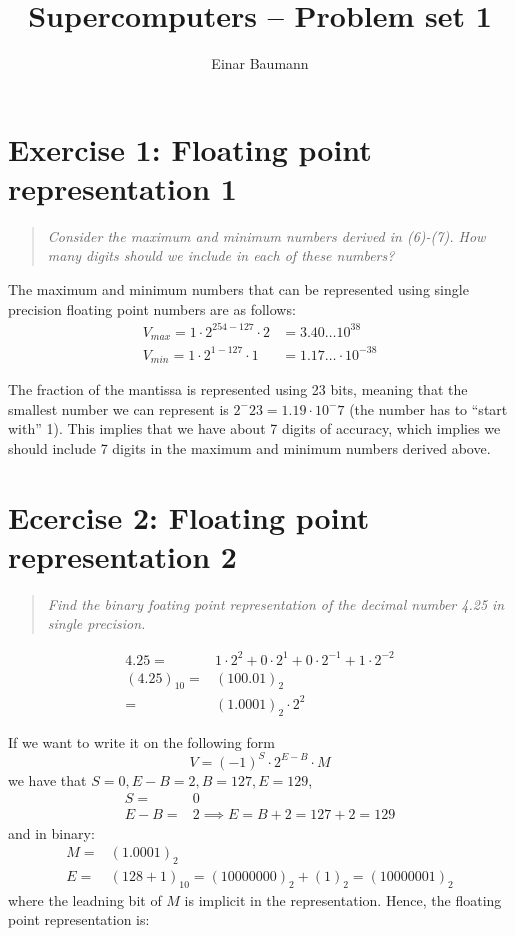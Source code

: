 


\title{Supercomputers -- Problem set 1}
\author{Einar Baumann}
\maketitle

\section{Exercise 1: Floating point representation 1} %
\label{sec:exercise_1}
\begin{quotation}
  \emph{Consider the maximum and minimum numbers derived in (6)-(7). How many digits should we include in each of these numbers?}
\end{quotation}
The maximum and minimum numbers that can be represented using single precision floating point numbers are as follows:
\begin{align}
  V_{max} = 1\cdot 2^{254-127}\cdot 2 & = 3.40\ldots 10^{38} \\
  V_{min} = 1\cdot 2^{1-127}\cdot 1   & = 1.17\ldots \cdot 10^{-38}
\end{align}

The fraction of the mantissa is represented using 23 bits, meaning that the smallest number we can represent is $2^-23 = 1.19\cdot 10^-7$ (the number has to ``start with'' 1). This implies that we have about 7 digits of accuracy, which implies we should include 7 digits in the maximum and minimum numbers derived above.


\section{Ecercise 2: Floating point representation 2} %
\label{sec:ecercise_2}
\begin{quotation}
  \emph{Find the binary foating point representation of the decimal number 4.25 in single precision.}
\end{quotation}
\begin{align}
  4.25        = & 1\cdot 2^2 + 0 \cdot 2^1 + 0\cdot 2^{-1} + 1\cdot 2^{-2} \\
  (4.25)_{10} = & (100.01)_2 \\
              = & (1.0001)_2 \cdot 2^2
\end{align}

If we want to write it on the following form
\begin{equation}
  V = (-1)^S \cdot 2^{E-B} \cdot M
\end{equation}
we have that $S=0, E-B=2, B=127, E=129$,
\begin{align}
  S = & 0 \\
  E-B = & 2 \implies E=B+2=127+2=129
\end{align}
and in binary:
\begin{align}
  M = & (1.0001)_2 \\
  E = & (128 + 1)_{10} = (10000000)_2 + (1)_2 = (10000001)_2
\end{align}     
where the leadning bit of $M$ is implicit in the representation. Hence, the floating point representation is:

